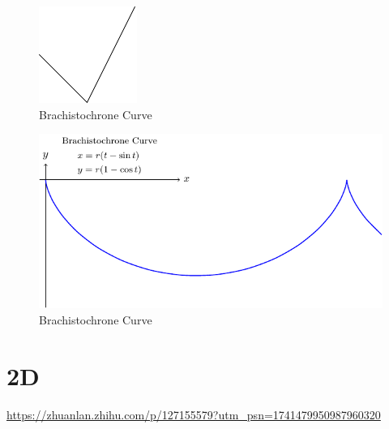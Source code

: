 \documentclass[
]{book}
\theoremstyle{definition}
\theoremstyle{definition}
\theoremstyle{definition}
\theoremstyle{definition}
\theoremstyle{remark}
\begin{document}
\begin{figure}
\includegraphics[width=0.9\linewidth]{202401311000-TikZ_files/figure-latex/unnamed-chunk-4-1} \caption{Brachistochrone Curve}\label{fig:unnamed-chunk-4}
\end{figure}

\begin{figure}
\includegraphics[width=0.9\linewidth]{202401311000-TikZ_files/figure-latex/unnamed-chunk-5-1} \caption{Brachistochrone Curve}\label{fig:unnamed-chunk-5}
\end{figure}

\hypertarget{d}{%
\section{2D}\label{d}}

\url{https://zhuanlan.zhihu.com/p/127155579?utm_psn=1741479950987960320}
\end{document}
